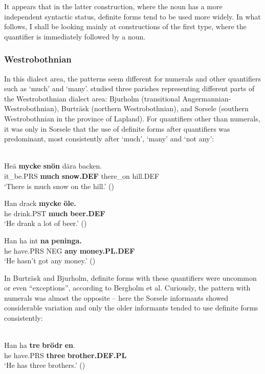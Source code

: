 It appears that in the latter construction, where the noun has a more independent syntactic status, definite forms tend to be used more widely. In what follows, I shall be looking mainly at constructions of the first type, where the quantifier is immediately followed by a noun. 

\subsubsection{Westrobothnian}
 In this dialect area, the patterns seem different for numerals and other quantifiers such as ‘much’ and ‘many’. \citet{BergholmEtAl1999} studied three parishes representing different parts of the Westrobothnian dialect area: Bjurholm (transitional Angermannian-Westrobothnian), Burträsk (northern Westrobothnian), and Sorsele (southern Westrobothnian in the province of Lapland). For quantifiers other than numerals, it was only in Sorsele that the use of definite forms after quantifiers was predominant, most consistently after ‘much’, ‘many’ and ‘not any’:

\ea\label{}
\\
\gll Heä  \textbf{mycke} \textbf{snön} dära  backen.\\
it\_be.PRS  \textbf{much} \textbf{snow.DEF} there\_on  hill.DEF\\
\glt ‘There is much snow on the hill.’ (\citet[24]{BergholmEtAl1999})

\z

\ea
\gll Han  drack  \textbf{mycke} \textbf{öle.}\\
he  drink.PST  \textbf{much} \textbf{beer.DEF}\\
\glt ‘He drank a lot of beer.’ (\citet[24]{BergholmEtAl1999})

\z 

\ea
\gll Han  ha  int  \textbf{na} \textbf{peninga.}\\
he  have.PRS  NEG  \textbf{any} \textbf{money.PL.DEF}\\
\glt ‘He hasn’t got any money.’ (\citet[24]{BergholmEtAl1999})

\z

In Burträsk and Bjurholm, definite forms with these quantifiers were uncommon or even “exceptions”, according to Bergholm et al. Curiously, the pattern with numerals was almost the opposite – here the Sorsele informants showed considerable variation and only the older informants tended to use definite forms consistently:

\ea \label{} 
\\
\gll Han  ha  \textbf{tre} \textbf{brödr} \textbf{en}.\\
he  have.PRS  \textbf{three} \textbf{brother.DEF.PL}\\
\glt ‘He has three brothers.’ (\citet[24]{BergholmEtAl1999})

